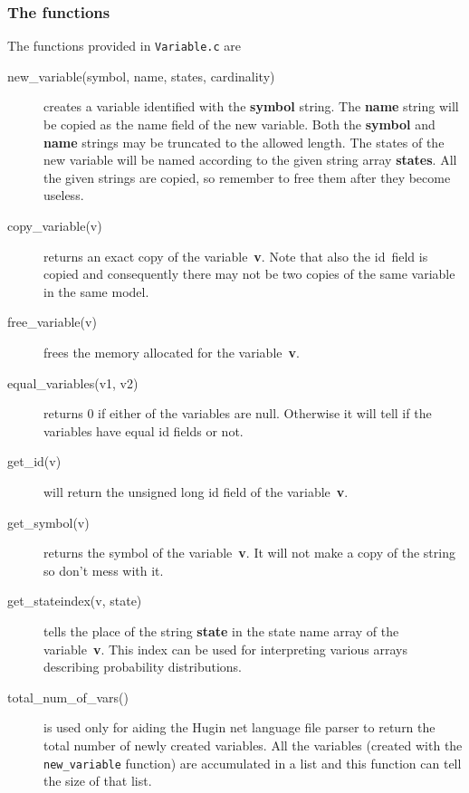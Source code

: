 \documentclass[12pt,a4paper]{report}
\newcommand{\cfilename}[1]{\texttt{#1}}
\newcommand{\cparameter}[1]{\textbf{#1}}
\newcommand{\cfunction}[1]{\texttt{#1}}
\begin{document}
\subsubsection{The functions}
The functions provided in \cfilename{Variable.c} are
\begin{description}
\item[new\_variable(symbol, name, states, cardinality)] creates a
variable identified with the \cparameter{symbol} string. The 
\cparameter{name} string will be copied as the name field of the new 
variable. Both the \cparameter{symbol} and \cparameter{name} strings 
may be truncated to the allowed length. The states of the new variable 
will be named according to the given string array \cparameter{states}. 
All the given strings are copied, so remember to free them after they 
become useless.

\item[copy\_variable(v)] returns an exact copy of the
variable~\cparameter{v}. Note that also the id~field is copied and
consequently there may not be two copies of the same variable in the
same model.

\item[free\_variable(v)] frees the memory allocated for the
variable~\cparameter{v}. 

\item[equal\_variables(v1, v2)] returns 0 if either of the variables
are null. Otherwise it will tell if the variables have equal id fields
or not.

\item[get\_id(v)] will return the unsigned long id field of the 
variable~\cparameter{v}.

\item[get\_symbol(v)] returns the symbol of the
variable~\cparameter{v}. It will not make a copy of the string so
don't mess with it.

\item[get\_stateindex(v, state)] tells the place of the string
\cparameter{state} in the state name array of the
variable~\cparameter{v}. This index can be used for interpreting various
arrays describing probability distributions. 

\item[total\_num\_of\_vars()] is used only for aiding the Hugin net 
language file parser to return the total number of newly created 
variables. All the variables (created with the
\cfunction{new\_variable} function) are accumulated in a list and
this function can tell the size of that list.


\end{description}
\end{document}

